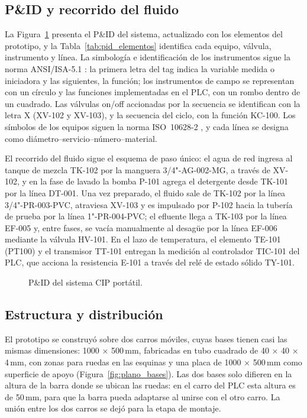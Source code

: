 \subsection{P\&ID y recorrido del fluido}
La Figura~\ref{fig:pid} presenta el P\&ID del sistema, actualizado con los elementos del prototipo, y la Tabla~\ref{tab:pid_elementos} identifica cada equipo, válvula, instrumento y línea. La simbología e identificación de los instrumentos sigue la norma ANSI/ISA-5.1 \cite{isa51_2009}: la primera letra del tag indica la variable medida o iniciadora y las siguientes, la función; los instrumentos de campo se representan con un círculo y las funciones implementadas en el PLC, con un rombo dentro de un cuadrado. Las válvulas on/off accionadas por la secuencia se identifican con la letra X (XV-102 y XV-103), y la secuencia del ciclo, con la función KC-100. Los símbolos de los equipos siguen la norma ISO~10628-2 \cite{iso10628_2}, y cada línea se designa como diámetro--servicio--número--material.

El recorrido del fluido sigue el esquema de paso único: el agua de red ingresa al tanque de mezcla TK-102 por la manguera 3/4"-AG-002-MG, a través de XV-102, y en la fase de lavado la bomba P-101 agrega el detergente desde TK-101 por la línea DT-001. Una vez preparado, el fluido sale de TK-102 por la línea 3/4"-PR-003-PVC, atraviesa XV-103 y es impulsado por P-102 hacia la tubería de prueba por la línea 1"-PR-004-PVC; el efluente llega a TK-103 por la línea EF-005 y, entre fases, se vacía manualmente al desagüe por la línea EF-006 mediante la válvula HV-101. En el lazo de temperatura, el elemento TE-101 (PT100) y el transmisor TT-101 entregan la medición al controlador TIC-101 del PLC, que acciona la resistencia E-101 a través del relé de estado sólido TY-101.

\begin{figure}[H]
\centering
\resizebox{\textwidth}{!}{}
\caption{P\&ID del sistema CIP portátil.}
\label{fig:pid}
\end{figure}



\subsection{Estructura y distribución}
El prototipo se construyó sobre dos carros móviles, cuyas bases tienen casi las mismas dimensiones: 1000 × 500\,mm, fabricadas en tubo cuadrado de 40 × 40 × 4\,mm, con zonas para ruedas en las esquinas y una placa de 1000 × 500\,mm como superficie de apoyo (Figura~\ref{fig:plano_bases}). Las dos bases solo difieren en la altura de la barra donde se ubican las ruedas: en el carro del PLC esta altura es de 50\,mm, para que la barra pueda adaptarse al unirse con el otro carro. La unión entre los dos carros se dejó para la etapa de montaje.

